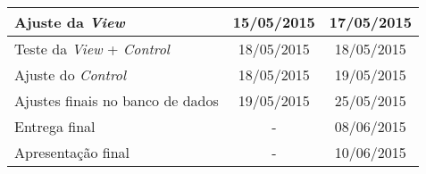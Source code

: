 \documentclass[a4paper,12pt]{article}
\begin{document}
{\begin{longtable}{|l|c|c|}
\hline
\rowcolor{electricgreen}
Ajuste da \textit{View}                   & 15/05/2015                           & 17/05/2015                        \\ \hline

\hline
\rowcolor{electricgreen}
Teste da \textit{View} + \textit{Control} & 18/05/2015                           & 18/05/2015                        \\ \hline

\hline
\rowcolor{electricgreen}
Ajuste do \textit{Control}                & 18/05/2015                           & 19/05/2015                        \\ \hline

\hline
\rowcolor{electricgreen}
Ajustes finais no banco de dados          & 19/05/2015                           & 25/05/2015                        \\ \hline
Entrega final                             & \multicolumn{1}{c|}{-}               & 08/06/2015                        \\ \hline
Apresentação final                        & \multicolumn{1}{c|}{-}               & 10/06/2015                        \\ \hline
\end{longtable}
}
\end{document}
